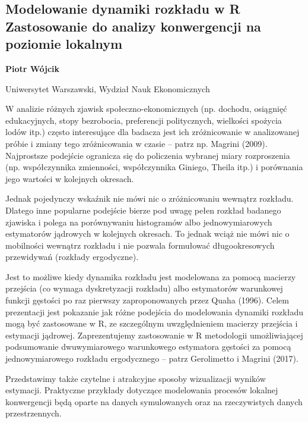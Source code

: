 \documentclass[\main/boa.tex]{subfiles}
\begin{document}
\subsection{Modelowanie dynamiki rozkładu w R\\ Zastosowanie do analizy konwergencji na poziomie lokalnym}

\begin{minipage}{0.915\textwidth}
	\centering
  {\bf {} Piotr Wójcik}
\end{minipage}


\begin{affiliations}
\begin{minipage}{0.915\textwidth}
\centering
Uniwersytet Warszawski, Wydział Nauk Ekonomicznych  \\[-2pt]
\end{minipage}
\end{affiliations}

\vskip 0.3cm

  W analizie różnych zjawisk społeczno-ekonomicznych (np. dochodu, osiągnięć edukacyjnych, stopy bezrobocia, preferencji politycznych, wielkości spożycia lodów itp.) często interesujące dla badacza jest ich zróżnicowanie w analizowanej próbie i zmiany tego zróżnicowania w czasie – patrz np. Magrini (2009). Najprostsze podejście ogranicza się do policzenia wybranej miary rozproszenia (np. współczynnika zmienności, współczynnika Giniego, Theila itp.) i porównania jego wartości w kolejnych okresach.
  
  Jednak pojedynczy wskaźnik nie mówi nic o zróżnicowaniu wewnątrz rozkładu. Dlatego inne popularne podejście bierze pod uwagę pełen rozkład badanego zjawiska i polega na porównywaniu histogramów albo jednowymiarowych estymatorów jądrowych w kolejnych okresach. To jednak wciąż nie mówi nic o mobilności wewnątrz rozkładu i nie pozwala formułować długookresowych przewidywań (rozkłady ergodyczne).
  
  Jest to możliwe kiedy dynamika rozkładu jest modelowana za pomocą macierzy przejścia (co wymaga dyskretyzacji rozkładu) albo estymatorów warunkowej funkcji gęstości po raz pierwszy zaproponowanych przez Quaha (1996). Celem prezentacji jest pokazanie jak różne podejścia do modelowania dynamiki rozkładu mogą być zastosowane w R, ze szczególnym uwzględnieniem macierzy przejścia i estymacji jądrowej. Zaprezentujemy zastosowanie w R metodologii umożliwiającej podsumowanie dwuwymiarowego warunkowego estymatora gęstości za pomocą jednowymiarowego rozkładu ergodycznego – patrz Gerolimetto i Magrini (2017).
  
  Przedstawimy także czytelne i atrakcyjne sposoby wizualizacji wyników estymacji. Praktyczne przykłady dotyczące modelowania procesów lokalnej konwergencji będą oparte na danych symulowanych oraz na rzeczywistych danych przestrzennych.
\end{document}
